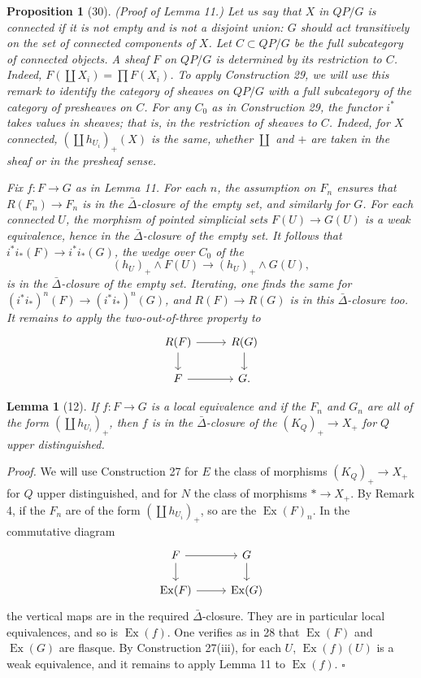 \documentclass[11pt]{article}
\theoremstyle{deligne}
\newtheorem*{proposition*}{Proposition}
\newtheorem*{lemma*}{Lemma}
\newenvironment{proofdel}{\noindent\textit{Proof.}}{\hfill$\square$}
\newcommand{\Ex}{\operatorname{Ex}}
\begin{document}
\begin{proposition*}[30]
(Proof of Lemma 11.) Let us say that \(X\) in \(QP/G\) is connected if it is not empty and is not a disjoint union: \(G\) should act transitively on the set of connected components of \(X\). Let \(C\subset QP/G\) be the full subcategory of connected objects. A sheaf \(F\) on \(QP/G\) is determined by its restriction to \(C\). Indeed, \(F(\coprod X_i)=\prod F(X_i)\). To apply Construction 29, we will use this remark to identify the category of sheaves on \(QP/G\) with a full subcategory of the category of presheaves on \(C\). For any \(C_0\) as in Construction 29, the functor \(i^*\) takes values in sheaves; that is, in the restriction of sheaves to \(C\). Indeed, for \(X\) connected, \((\coprod h_{U_i})_+(X)\) is the same, whether \(\coprod\) and \(+\) are taken in the sheaf or in the presheaf sense.

Fix \(f:F\to G\) as in Lemma 11. For each \(n\), the assumption on \(F_n\) ensures that \(R(F_n)\to F_n\) is in the \(\bar\Delta\)-closure of the empty set, and similarly for \(G\). For each connected \(U\), the morphism of pointed simplicial sets \(F(U)\to G(U)\) is a weak equivalence, hence in the \(\bar\Delta\)-closure of the empty set. It follows that \(i^*i_*(F)\to i^*i_*(G)\), the wedge over \(C_0\) of the
\[
(h_U)_+\wedge F(U)\longrightarrow (h_U)_+\wedge G(U),
\]
is in the \(\bar\Delta\)-closure of the empty set. Iterating, one finds the same for \((i^*i_*)^n(F)\to(i^*i_*)^n(G)\), and \(R(F)\to R(G)\) is in this \(\bar\Delta\)-closure too. It remains to apply the two-out-of-three property to
\[
\begin{tikzcd}[column sep=2.6em,row sep=1.6em]
R(F) \arrow[r] \arrow[d] & R(G) \arrow[d] \\
F \arrow[r] & G .
\end{tikzcd}
\]
\end{proposition*}

\begin{lemma*}[12]
If \(f:F\to G\) is a local equivalence and if the \(F_n\) and \(G_n\) are all of the form \((\coprod h_{U_i})_+\), then \(f\) is in the \(\bar\Delta\)-closure of the \((K_Q)_+\to X_+\) for \(Q\) upper distinguished.
\end{lemma*}

\begin{proofdel}
We will use Construction 27 for \(E\) the class of morphisms \((K_Q)_+\to X_+\) for \(Q\) upper distinguished, and for \(N\) the class of morphisms \(*\to X_+\). By Remark 4, if the \(F_n\) are of the form \((\coprod h_{U_i})_+\), so are the \(\Ex(F)_n\). In the commutative diagram
\[
\begin{tikzcd}[column sep=2.6em,row sep=1.6em]
F \arrow[r] \arrow[d] & G \arrow[d] \\
\Ex(F) \arrow[r] & \Ex(G)
\end{tikzcd}
\]
the vertical maps are in the required \(\bar\Delta\)-closure. They are in particular local equivalences, and so is \(\Ex(f)\). One verifies as in 28 that \(\Ex(F)\) and \(\Ex(G)\) are flasque. By Construction 27(iii), for each \(U\), \(\Ex(f)(U)\) is a weak equivalence, and it remains to apply Lemma 11 to \(\Ex(f)\).
\end{proofdel}
\end{document}
